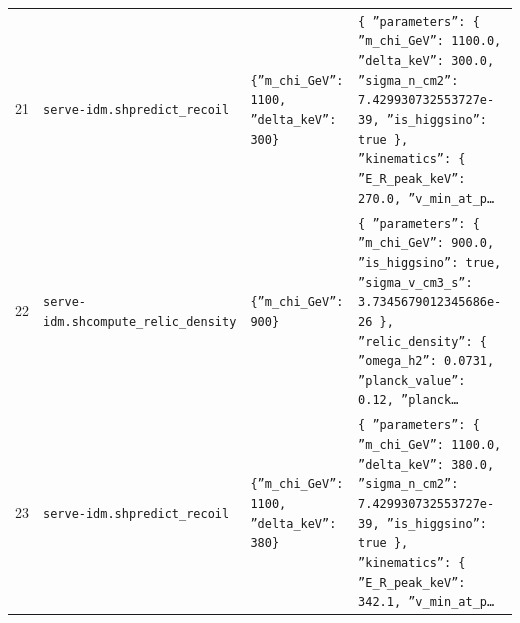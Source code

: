 \documentclass[11pt,a4paper]{article}
\begin{document}
\begin{longtable}{@{}p{}p{}p{}p{}@{}}
21 & \texttt{serve-idm.sh}\newline\texttt{predict\_\allowbreak{}recoil} & \texttt{\{''m\_\allowbreak{}chi\_\allowbreak{}GeV'':\allowbreak{} 1100,\allowbreak{} ''delta\_\allowbreak{}keV'':\allowbreak{} 300\}\allowbreak{}} & \texttt{\{   ''parameters'':\allowbreak{} \{     ''m\_\allowbreak{}chi\_\allowbreak{}GeV'':\allowbreak{} 1100.0,\allowbreak{}     ''delta\_\allowbreak{}keV'':\allowbreak{} 300.0,\allowbreak{}     ''sigma\_\allowbreak{}n\_\allowbreak{}cm2'':\allowbreak{} 7.429930732553727e-39,\allowbreak{}     ''is\_\allowbreak{}higgsino'':\allowbreak{} true   \}\allowbreak{},\allowbreak{}   ''kinematics'':\allowbreak{} \{     ''E\_\allowbreak{}R\_\allowbreak{}peak\_\allowbreak{}keV'':\allowbreak{} 270.0,\allowbreak{}     ''v\_\allowbreak{}min\_\allowbreak{}at\_\allowbreak{}p\ldots{}\allowbreak{}} \\
22 & \texttt{serve-idm.sh}\newline\texttt{compute\_\allowbreak{}relic\_\allowbreak{}density} & \texttt{\{''m\_\allowbreak{}chi\_\allowbreak{}GeV'':\allowbreak{} 900\}\allowbreak{}} & \texttt{\{   ''parameters'':\allowbreak{} \{     ''m\_\allowbreak{}chi\_\allowbreak{}GeV'':\allowbreak{} 900.0,\allowbreak{}     ''is\_\allowbreak{}higgsino'':\allowbreak{} true,\allowbreak{}     ''sigma\_\allowbreak{}v\_\allowbreak{}cm3\_\allowbreak{}s'':\allowbreak{} 3.7345679012345686e-26   \}\allowbreak{},\allowbreak{}   ''relic\_\allowbreak{}density'':\allowbreak{} \{     ''omega\_\allowbreak{}h2'':\allowbreak{} 0.0731,\allowbreak{}     ''planck\_\allowbreak{}value'':\allowbreak{} 0.12,\allowbreak{}     ''planck\ldots{}\allowbreak{}} \\
23 & \texttt{serve-idm.sh}\newline\texttt{predict\_\allowbreak{}recoil} & \texttt{\{''m\_\allowbreak{}chi\_\allowbreak{}GeV'':\allowbreak{} 1100,\allowbreak{} ''delta\_\allowbreak{}keV'':\allowbreak{} 380\}\allowbreak{}} & \texttt{\{   ''parameters'':\allowbreak{} \{     ''m\_\allowbreak{}chi\_\allowbreak{}GeV'':\allowbreak{} 1100.0,\allowbreak{}     ''delta\_\allowbreak{}keV'':\allowbreak{} 380.0,\allowbreak{}     ''sigma\_\allowbreak{}n\_\allowbreak{}cm2'':\allowbreak{} 7.429930732553727e-39,\allowbreak{}     ''is\_\allowbreak{}higgsino'':\allowbreak{} true   \}\allowbreak{},\allowbreak{}   ''kinematics'':\allowbreak{} \{     ''E\_\allowbreak{}R\_\allowbreak{}peak\_\allowbreak{}keV'':\allowbreak{} 342.1,\allowbreak{}     ''v\_\allowbreak{}min\_\allowbreak{}at\_\allowbreak{}p\ldots{}\allowbreak{}} \\

\end{longtable}
\end{document}
